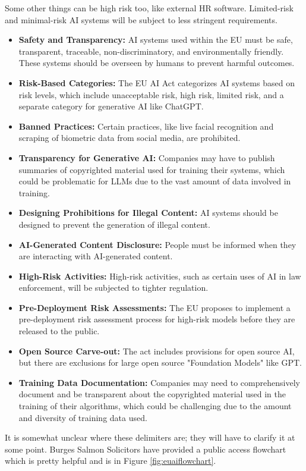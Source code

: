 Some other things can be high risk too, like external HR software. Limited-risk and minimal-risk AI systems will be subject to less stringent requirements. 
\begin{itemize}
  \item \textbf{Safety and Transparency:} AI systems used within the EU must be safe, transparent, traceable, non-discriminatory, and environmentally friendly. These systems should be overseen by humans to prevent harmful outcomes.
  \item \textbf{Risk-Based Categories:} The EU AI Act categorizes AI systems based on risk levels, which include unacceptable risk, high risk, limited risk, and a separate category for generative AI like ChatGPT.
  \item \textbf{Banned Practices:} Certain practices, like live facial recognition and scraping of biometric data from social media, are prohibited.
  \item \textbf{Transparency for Generative AI:} Companies may have to publish summaries of copyrighted material used for training their systems, which could be problematic for LLMs due to the vast amount of data involved in training.
  \item \textbf{Designing Prohibitions for Illegal Content:} AI systems should be designed to prevent the generation of illegal content.
  \item \textbf{AI-Generated Content Disclosure:} People must be informed when they are interacting with AI-generated content.
  \item \textbf{High-Risk Activities:} High-risk activities, such as certain uses of AI in law enforcement, will be subjected to tighter regulation.
  \item \textbf{Pre-Deployment Risk Assessments:} The EU proposes to implement a pre-deployment risk assessment process for high-risk models before they are released to the public.
  \item \textbf{Open Source Carve-out:} The act includes provisions for open source AI, but there are exclusions for large open source "Foundation Models" like GPT.
  \item \textbf{Training Data Documentation:} Companies may need to comprehensively document and be transparent about the copyrighted material used in the training of their algorithms, which could be challenging due to the amount and diversity of training data used.
\end{itemize}

It is somewhat unclear where these delimiters are; they will have to clarify it at some point. Burges Salmon Solicitors have provided a public access flowchart which is pretty helpful and is in Figure \ref{fig:euaiflowchart}.

